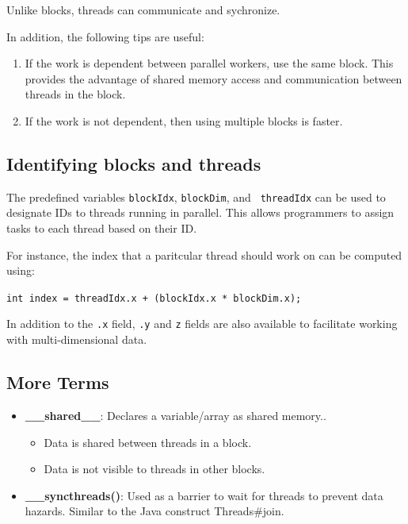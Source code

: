\documentclass[twoside]{article}
\begin{document}
Unlike blocks, threads can communicate and sychronize.

In addition, the following tips are useful:

\begin{enumerate}
    \item If the work is dependent between parallel workers, use the same
        block. This provides the advantage of shared memory access
        and communication between threads in the block.
    \item If the work is not dependent, then using multiple blocks is
        faster.
\end{enumerate}

\subsection{Identifying blocks and threads}

The predefined variables {\tt blockIdx}, {\tt blockDim}, and {\tt
threadIdx} can be used to designate IDs to threads running in parallel. This
allows programmers to assign tasks to each thread based on their ID.

For instance, the index that a paritcular thread should work on can be
computed using:

\begin{center}
    {{\tt int index = threadIdx.x + (blockIdx.x * blockDim.x); }}
\end{center}

In addition to the {\tt .x} field, {\tt .y} and {\tt z} fields are also
available to facilitate working with multi-dimensional data.

\subsection{More Terms}

\begin{itemize}
    \item {\bf \_\_shared\_\_}: Declares a variable/array as shared memory..
        \begin{itemize}
            \item Data is shared between threads in a block.
            \item Data is not visible to threads in other blocks.
        \end{itemize}
    \item {\bf \_\_syncthreads()}: Used as a barrier to wait for threads to prevent data
        hazards. Similar to the Java construct Threads#join.
\end{itemize}
\end{document}
